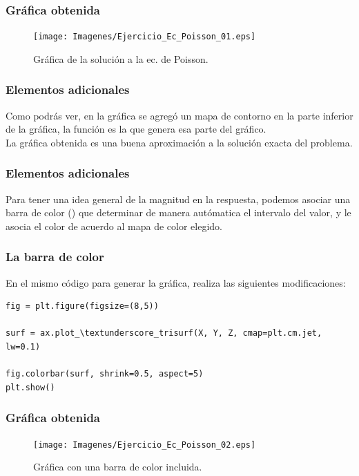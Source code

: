 {
\begin{frame}
\frametitle{Gráfica obtenida}
\begin{figure}[h!]
   \centering
   \texttt{[image: Imagenes/Ejercicio\_Ec\_Poisson\_01.eps]}
   \caption{Gráfica de la solución a la ec. de Poisson.}
\end{figure}
\end{frame}
}
\begin{frame}
\frametitle{Elementos adicionales}
Como podrás ver, en la gráfica se agregó un mapa de contorno en la parte inferior de la gráfica, la función  es la que genera esa parte del gráfico.
\\
\bigskip
\pause
La gráfica obtenida es una buena aproximación a la solución exacta del problema.
\end{frame}
\begin{frame}
\frametitle{Elementos adicionales}
Para tener una idea general de la magnitud en la respuesta, podemos asociar una barra de color () que determinar de manera autómatica el intervalo del valor, y le asocia el color de acuerdo al mapa de color elegido.
\end{frame}
\begin{frame}[fragile]
\frametitle{La barra de color}
En el mismo código para generar la gráfica, realiza las siguientes modificaciones:
\begin{lstlisting}[caption=Cambios en el código de la gráfica, style=FormattedNumber, basicstyle=\linespread{1.1}\ttfamily=\small, columns=fullflexible]
fig = plt.figure(figsize=(8,5))

surf = ax.plot_\textunderscore_trisurf(X, Y, Z, cmap=plt.cm.jet, lw=0.1)

fig.colorbar(surf, shrink=0.5, aspect=5)
plt.show()
\end{lstlisting}
\end{frame}
{
\begin{frame}
\frametitle{Gráfica obtenida}
\begin{figure}[h!]
   \centering
   \texttt{[image: Imagenes/Ejercicio\_Ec\_Poisson\_02.eps]}
   \caption{Gráfica con una barra de color incluida.}
\end{figure}
\end{frame}
}
